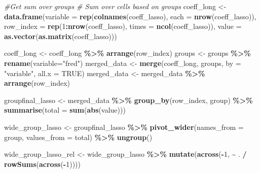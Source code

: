 \documentclass[
]{article}
\newenvironment{Shaded}{\begin{snugshade}}{\end{snugshade}}
\newcommand{\AttributeTok}[1]{\textcolor[rgb]{0.13,0.29,0.53}{#1}}
\newcommand{\CommentTok}[1]{\textcolor[rgb]{0.56,0.35,0.01}{\textit{#1}}}
\newcommand{\ConstantTok}[1]{\textcolor[rgb]{0.56,0.35,0.01}{#1}}
\newcommand{\DecValTok}[1]{\textcolor[rgb]{0.00,0.00,0.81}{#1}}
\newcommand{\FunctionTok}[1]{\textcolor[rgb]{0.13,0.29,0.53}{\textbf{#1}}}
\newcommand{\NormalTok}[1]{#1}
\newcommand{\OtherTok}[1]{\textcolor[rgb]{0.56,0.35,0.01}{#1}}
\newcommand{\SpecialCharTok}[1]{\textcolor[rgb]{0.81,0.36,0.00}{\textbf{#1}}}
\newcommand{\StringTok}[1]{\textcolor[rgb]{0.31,0.60,0.02}{#1}}
\begin{document}
\begin{Shaded}
\begin{Highlighting}[]
\CommentTok{\#Get sum over groups}
\CommentTok{\# Sum over cells based on groups}
\NormalTok{coeff\_long }\OtherTok{\textless{}{-}} \FunctionTok{data.frame}\NormalTok{(}\AttributeTok{variable =} \FunctionTok{rep}\NormalTok{(}\FunctionTok{colnames}\NormalTok{(coeff\_lasso), }\AttributeTok{each =} \FunctionTok{nrow}\NormalTok{(coeff\_lasso)),}
                            \AttributeTok{row\_index =} \FunctionTok{rep}\NormalTok{(}\DecValTok{1}\SpecialCharTok{:}\FunctionTok{nrow}\NormalTok{(coeff\_lasso), }\AttributeTok{times =} \FunctionTok{ncol}\NormalTok{(coeff\_lasso)),}
                            \AttributeTok{value =} \FunctionTok{as.vector}\NormalTok{(}\FunctionTok{as.matrix}\NormalTok{(coeff\_lasso)))}

\NormalTok{coeff\_long }\OtherTok{\textless{}{-}}\NormalTok{ coeff\_long }\SpecialCharTok{\%\textgreater{}\%} \FunctionTok{arrange}\NormalTok{(row\_index)}
\NormalTok{groups }\OtherTok{\textless{}{-}}\NormalTok{ groups }\SpecialCharTok{\%\textgreater{}\%} \FunctionTok{rename}\NormalTok{(}\AttributeTok{variable=}\StringTok{"fred"}\NormalTok{)}
\NormalTok{merged\_data }\OtherTok{\textless{}{-}} \FunctionTok{merge}\NormalTok{(coeff\_long, groups, }\AttributeTok{by =} \StringTok{"variable"}\NormalTok{, }\AttributeTok{all.x =} \ConstantTok{TRUE}\NormalTok{)}
\NormalTok{merged\_data }\OtherTok{\textless{}{-}}\NormalTok{ merged\_data }\SpecialCharTok{\%\textgreater{}\%} \FunctionTok{arrange}\NormalTok{(row\_index)}

\NormalTok{groupfinal\_lasso }\OtherTok{\textless{}{-}}\NormalTok{ merged\_data }\SpecialCharTok{\%\textgreater{}\%} \FunctionTok{group\_by}\NormalTok{(row\_index, group) }\SpecialCharTok{\%\textgreater{}\%} \FunctionTok{summarise}\NormalTok{(}\AttributeTok{total =} \FunctionTok{sum}\NormalTok{(}\FunctionTok{abs}\NormalTok{(value)))}

\NormalTok{wide\_group\_lasso }\OtherTok{\textless{}{-}}\NormalTok{ groupfinal\_lasso }\SpecialCharTok{\%\textgreater{}\%}
  \FunctionTok{pivot\_wider}\NormalTok{(}\AttributeTok{names\_from =}\NormalTok{ group, }\AttributeTok{values\_from =}\NormalTok{ total) }\SpecialCharTok{\%\textgreater{}\%} \FunctionTok{ungroup}\NormalTok{()}

\NormalTok{wide\_group\_lasso\_rel }\OtherTok{\textless{}{-}}\NormalTok{ wide\_group\_lasso }\SpecialCharTok{\%\textgreater{}\%}
  \FunctionTok{mutate}\NormalTok{(}\FunctionTok{across}\NormalTok{(}\SpecialCharTok{{-}}\DecValTok{1}\NormalTok{, }\SpecialCharTok{\textasciitilde{}}\NormalTok{ . }\SpecialCharTok{/} \FunctionTok{rowSums}\NormalTok{(}\FunctionTok{across}\NormalTok{(}\SpecialCharTok{{-}}\DecValTok{1}\NormalTok{))))}


\end{Highlighting}
\end{Shaded}
\end{document}
